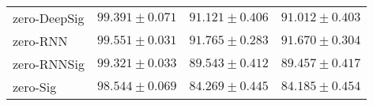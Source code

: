 \begin{tabular}{llll}
zero-DeepSig   &                           $ 99.391 \pm 0.071 $ &                           $ 91.121 \pm 0.406 $ &                           $ 91.012 \pm 0.403 $ \\
zero-RNN       &                           $ 99.551 \pm 0.031 $ &                           $ 91.765 \pm 0.283 $ &                           $ 91.670 \pm 0.304 $ \\
zero-RNNSig    &                           $ 99.321 \pm 0.033 $ &                           $ 89.543 \pm 0.412 $ &                           $ 89.457 \pm 0.417 $ \\
zero-Sig       &                           $ 98.544 \pm 0.069 $ &                           $ 84.269 \pm 0.445 $ &                           $ 84.185 \pm 0.454 $ \\
\bottomrule
\end{tabular}
